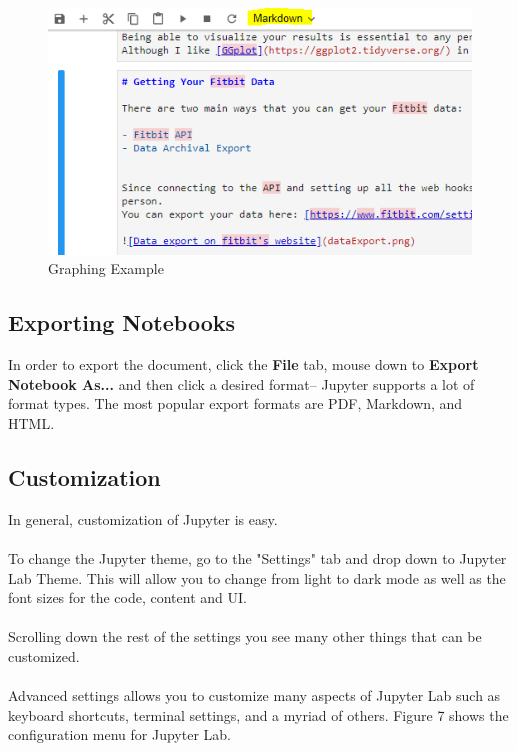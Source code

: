 \documentclass[pdftex,12pt]{artikel3}
\begin{document}
\begin{figure}[h!]
    \centering
    \includegraphics[width=15cm]{markdown.png}
    \caption{Graphing Example}
    \label{fig:markdownExample}
\end{figure}


\subsection{Exporting Notebooks}
In order to export the document, click the \textbf{File} tab, mouse down to \textbf{Export Notebook As...} and then click a desired format-- Jupyter supports a lot of format types.
The most popular export formats are PDF, Markdown, and HTML. 

\subsection{Customization}
In general, customization of Jupyter is easy.\\
\\
To change the Jupyter theme, go to the "Settings" tab and drop down to Jupyter Lab Theme. This will allow you to change from light to dark mode as well as the font sizes for the code, content and UI.\\
\\
Scrolling down the rest of the settings you see many other things that can be customized.\\
\\
Advanced settings allows you to customize many aspects of Jupyter Lab such as keyboard shortcuts, terminal settings, and a myriad of others. Figure 7 shows the configuration menu for Jupyter Lab.
\end{document}

